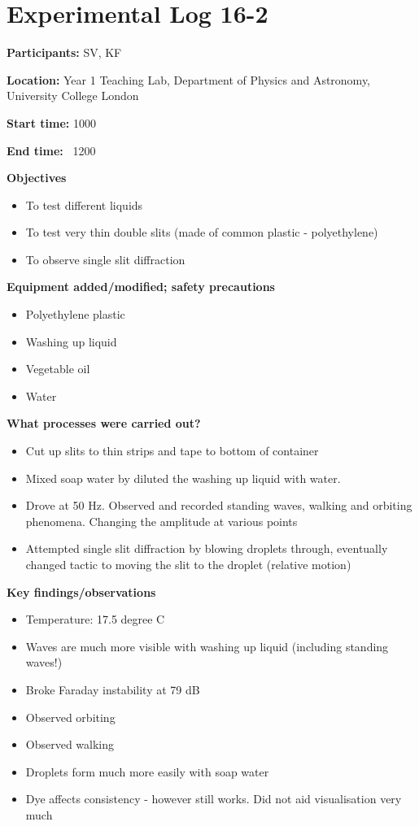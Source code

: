 
\section{Experimental Log 16-2}

\textbf{Participants:} SV, KF

\textbf{Location:} Year 1 Teaching Lab, Department of Physics and Astronomy, University College London

\textbf{Start time:} 1000

\textbf{End time:} \ 1200

\bigskip

\textbf{Objectives}

\begin{itemize}
\item To test different liquids
\item To test very thin double slits (made of common plastic - polyethylene)
\item To observe single slit diffraction
\end{itemize}
\bigskip

\textbf{Equipment added/modified; safety precautions}

\begin{itemize}
\item Polyethylene plastic
\item Washing up liquid
\item Vegetable oil
\item Water
\end{itemize}
\bigskip

\textbf{What processes were carried out?}

\begin{itemize}
\item Cut up slits to thin strips and tape to bottom of container
\item Mixed soap water by diluted the washing up liquid with water.
\item Drove at 50 Hz. Observed and recorded standing waves, walking and orbiting phenomena. Changing the amplitude at various points
\item Attempted single slit diffraction by blowing droplets through, eventually changed tactic to moving the slit to the droplet (relative motion)
\end{itemize}
\bigskip

\textbf{Key findings/observations}

\begin{itemize}
\item Temperature: 17.5 degree C
\item Waves are much more visible with washing up liquid (including standing waves!)
\item Broke Faraday instability at 79 dB
\item Observed orbiting
\item Observed walking
\item Droplets form much more easily with soap water
\item Dye affects consistency - however still works. Did not aid visualisation very much
\end{itemize}
\bigskip

